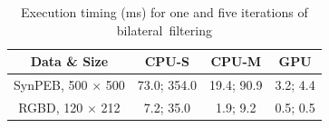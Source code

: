 
\begin{table}[H]
\centering
\caption{Execution timing (ms) for one and five iterations of bilateral~filtering}\label{table:ch3_results_bilateral}
\begin{tabular}{@{}cccc@{}}
\toprule
\textbf{Data \& Size}    & \textbf{CPU-S}       & \textbf{CPU-M}           & \textbf{GPU}      \\ \midrule
SynPEB, 500 $\times$ 500 & 73.0; 354.0 & 19.4; 90.9      & 3.2; 4.4 \\
RGBD, 120 $\times$ 212   & 7.2; 35.0   & 1.9; 9.2        & 0.5; 0.5 \\ \bottomrule
\end{tabular}
\end{table}
\unskip



